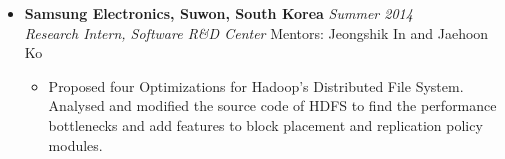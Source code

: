 \documentclass[11pt,a4paper,sans]{moderncv}        %
\begin{document}
\begin{itemize}
	\item \textbf{Samsung Electronics, Suwon, South Korea} \hfill \emph{Summer 2014} \\
	\emph{Research Intern, Software R\&D Center} \hfill Mentors: Jeongshik In and Jaehoon Ko
	\begin{itemize}
		\item Proposed four Optimizations for Hadoop's Distributed File System. Analysed and
		modified the source code of HDFS to find the performance bottlenecks and add features to
		block placement and replication policy modules.
	\end{itemize}

\end{itemize}

\vspace*{2pt}
\end{document}
